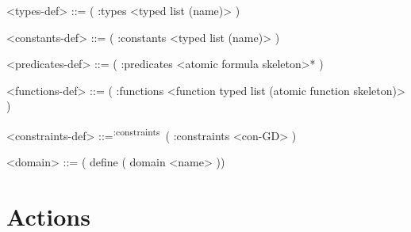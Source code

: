 \documentclass[]{article}
\newcommand{\constraints}{\textsuperscript{:constraints}~}
\begin{document}
\begin{grammar}
    <types-def> ::= ( :types <typed list (name)> )

    <constants-def> ::= ( :constants <typed list (name)> )

    <predicates-def> ::= ( :predicates <atomic formula skeleton>* )

    <functions-def> ::= ( :functions <function typed list (atomic function skeleton)> )

    <constraints-def> ::=\constraints ( :constraints <con-GD> )

    <domain> ::= ( define ( domain <name> )      )

\end{grammar}

\section{Actions}
\end{document}

